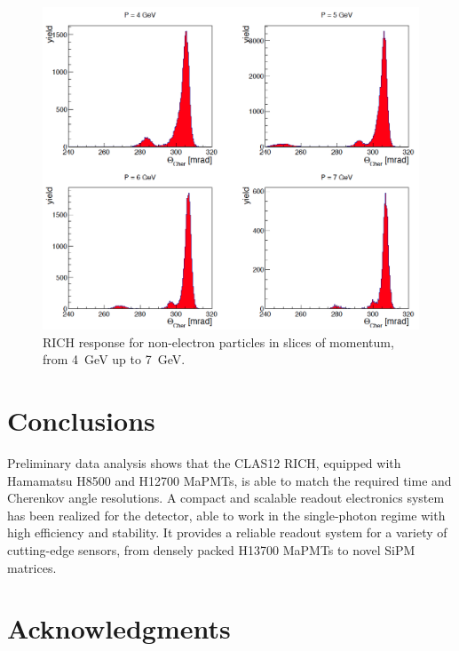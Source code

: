 \documentclass[5p,times,twocolumn]{elsarticle}
\begin{document}
\begin{figure}[t]
\begin{center}
\includegraphics[width=1.0\columnwidth]{Pslices.png}
\end{center}
\caption{RICH response for non-electron particles in slices of momentum, from 4~GeV up to 7~GeV.}
\label{Fig:CHhad2}
\end{figure}

\section{Conclusions}

Preliminary data analysis shows that the CLAS12 RICH, equipped with Hamamatsu H8500 and H12700 MaPMTs,
is able to match the required time and Cherenkov angle resolutions. A compact and scalable readout electronics system
has been realized for the detector, able to work in the single-photon regime with high efficiency and stability.
It provides a reliable readout system for a variety of cutting-edge sensors, from densely packed H13700 MaPMTs
to novel SiPM matrices.

\section{Acknowledgments}
\end{document}
